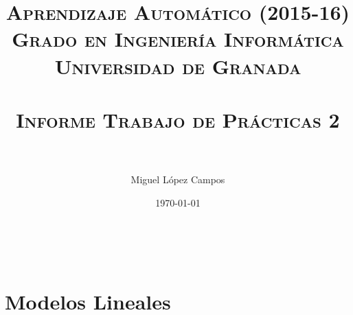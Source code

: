 

\title{
\normalfont \normalsize 
\textsc{{\bf Aprendizaje Automático (2015-16) \\ Grado en Ingeniería Informática \\ Universidad de Granada} \\ [25pt] %
\horrule{0.5pt} \\[0.4cm] %
\huge Informe Trabajo de Prácticas 2 \\ %
\horrule{2pt} \\[0.5cm] %
}}
\author{Miguel López Campos} %

\date{\normalsize\today} %


	
	\maketitle %
	\newpage %
	\tableofcontents %
	\listoffigures

	
	\newpage
	
	\
	
	\section{Modelos Lineales}
